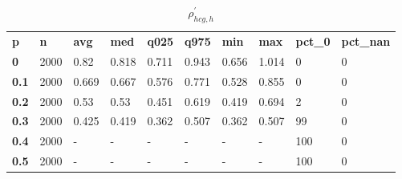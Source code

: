 \begin{table}[h]
 \centering 
\footnotesize
\caption{$\rho_{hcg,h}^\prime $}
\label{tab:alphahcgh}
\begin{tabular}[h]{| l l l l l l l l l l|
    } \hline
\textbf{ p} & \textbf{ n} & \textbf{ avg} & \textbf{ med} & \textbf{ q025} & \textbf{ q975} & \textbf{ min} & \textbf{ max} & \textbf{ pct\_0} & \textbf{ pct\_nan}
           \\
  \textbf{  0} & 2000 &  0.82 & 0.818 & 0.711 & 0.943 & 0.656 & 1.014 &   0 & 0
           \\
  \textbf{0.1} & 2000 & 0.669 & 0.667 & 0.576 & 0.771 & 0.528 & 0.855 &   0 & 0
           \\
  \textbf{0.2} & 2000 &  0.53 &  0.53 & 0.451 & 0.619 & 0.419 & 0.694 &   2 & 0
           \\
  \textbf{0.3} & 2000 & 0.425 & 0.419 & 0.362 & 0.507 & 0.362 & 0.507 &  99 & 0
           \\
  \textbf{0.4} & 2000 & - & - & - & - & - & - & 100 & 0
           \\
  \textbf{0.5} & 2000 & - & - & - & - & - & - & 100 & 0
           \\
 \hline \end{tabular}
 \end{table}
